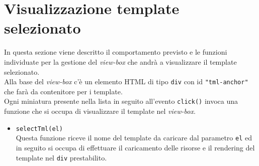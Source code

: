 \section{Visualizzazione template selezionato}
In questa sezione viene descritto il comportamento previsto e le funzioni individuate per la gestione del \textit{view-box} che andrà a visualizzare il template selezionato.\\
Alla base del \textit{view-box} c'è un elemento HTML di tipo \texttt{div} con id \texttt{"tml-anchor"} che farà da contenitore per i template.\\
Ogni miniatura presente nella lista in seguito all'evento \texttt{click()} invoca una funzione che si occupa di visualizzare il template nel \textit{view-box}.
\begin{itemize}
	\item \texttt{selectTml(el)}\\
	Questa funzione riceve il nome del template da caricare dal parametro \texttt{el} ed in seguito si occupa di effettuare il caricamento delle risorse e il rendering del template nel \texttt{div} prestabilito.
\end{itemize}
